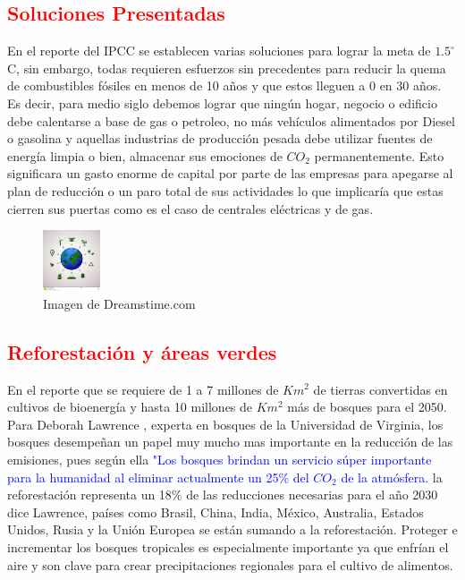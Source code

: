 \subsection{\textcolor{red}{Soluciones Presentadas}}
En el reporte del IPCC se establecen varias soluciones para lograr la meta de $1.5^\circ$C, sin embargo, todas requieren  
esfuerzos sin precedentes para reducir la quema de combustibles fósiles en menos de 10 años y que estos lleguen a 0 en 30 años. Es decir, para medio siglo debemos lograr que ningún hogar, negocio o edificio debe calentarse a base de gas o petroleo, no más vehículos alimentados por Diesel o gasolina y aquellas industrias de producción pesada debe utilizar fuentes de energía limpia o bien, almacenar sus emociones de $CO_2$ permanentemente. Esto significara un gasto enorme de capital por parte de las empresas para apegarse al plan de reducción o un paro total de sus actividades lo que implicaría que estas cierren sus puertas como es el caso de centrales eléctricas y de gas.
\begin{figure}[H]
  \centering 
  \includegraphics[width=0.15\textwidth]{figuras/planeta.jpg}
  \caption{Imagen de Dreamstime.com}
  \label{fig:revista_inatel}
\end{figure}

\subsection{\textcolor{red}{Reforestación y áreas verdes}}
En el reporte que se requiere de 1 a 7 millones de $Km^2$ de tierras convertidas en cultivos de bioenergía y hasta 10 millones de $Km^2$ más de bosques para el 2050. Para Deborah Lawrence , experta en bosques de la Universidad de Virginia, los bosques desempeñan un papel muy mucho mas importante en la reducción de las emisiones, pues según ella \textcolor{blue}{"Los bosques brindan un servicio súper importante para la humanidad al eliminar actualmente un 25\% del $CO_2$ de la atmósfera}. la reforestación representa un 18\% de las reducciones necesarias para el año 2030 dice Lawrence, países como Brasil, China, India, México, Australia, Estados Unidos, Rusia y la Unión Europea se están sumando a la reforestación. Proteger e incrementar los bosques tropicales es especialmente importante ya que enfrían el aire y son clave para crear precipitaciones regionales para el cultivo de alimentos.


